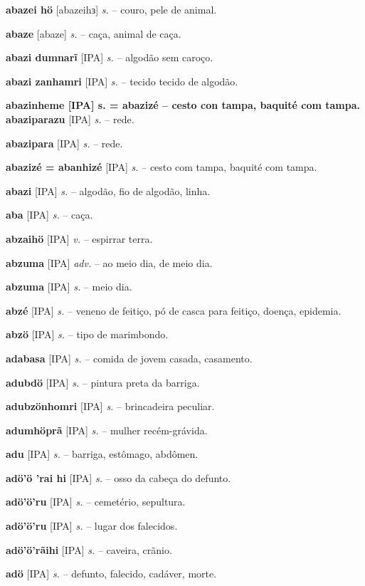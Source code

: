 \textbf{abazei hö} [abazeihɜ] \textit{s.} -- couro, pele de animal.

\textbf{abaze} [abaze] \textit{s.} -- caça, animal de caça. \href{https://xavante.pythonanywhere.com/static/dicionario/play.html?file=animal.wav}{\faHeadphones}

\textbf{abazi dumnarĩ} [IPA] \textit{s.} -- algodão sem caroço.

\textbf{abazi zanhamri} [IPA] \textit{s.} -- tecido tecido de algodão.

\textbf{abazinheme [IPA] s. = abazizé -- cesto con tampa, baquité com tampa. abaziparazu} [IPA] \textit{s.} -- rede.

\textbf{abazipara} [IPA] \textit{s.} -- rede.

\textbf{abazizé = abanhizé} [IPA] \textit{s.} -- cesto com tampa, baquité com tampa.

\textbf{abazi} [IPA] \textit{s.} -- algodão, fio de algodão, linha.

\textbf{aba} [IPA] \textit{s.} -- caça.

\textbf{abzaihö} [IPA] \textit{v.} -- espirrar terra.

\textbf{abzuma} [IPA] \textit{adv.} -- ao meio dia, de meio dia.

\textbf{abzuma} [IPA] \textit{s.} -- meio dia.

\textbf{abzé} [IPA] \textit{s.} -- veneno de feitiço, pó de casca para feitiço, doença, epidemia.

\textbf{abzö} [IPA] \textit{s.} -- tipo de marimbondo.

\textbf{adabasa} [IPA] \textit{s.} -- comida de jovem casada, casamento.

\textbf{adubdö} [IPA] \textit{s.} -- pintura preta da barriga.

\textbf{adubzönhomri} [IPA] \textit{s.} -- brincadeira peculiar.

\textbf{adumhöprã} [IPA] \textit{s.} -- mulher recém-grávida.

\textbf{adu} [IPA] \textit{s.} -- barriga, estômago, abdômen.

\textbf{adö'ö 'rai hi} [IPA] \textit{s.} -- osso da cabeça do defunto.

\textbf{adö'ö'ru} [IPA] \textit{s.} -- cemetério, sepultura.

\textbf{adö'ö'ru} [IPA] \textit{s.} -- lugar dos falecidos.

\textbf{adö'ö'rãihi} [IPA] \textit{s.} -- caveira, crãnio.

\textbf{adö} [IPA] \textit{s.} -- defunto, falecido, cadáver, morte.

